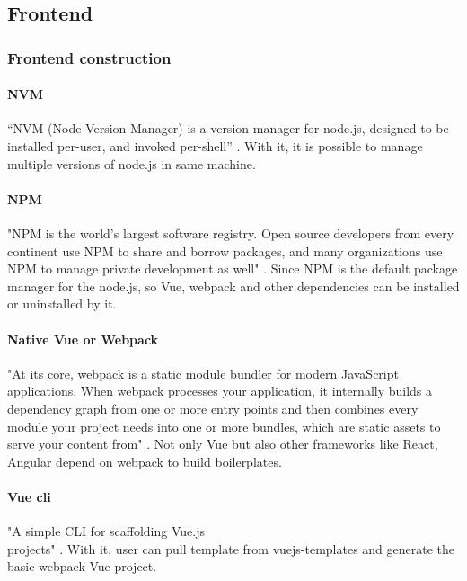 \documentclass[conference]{IEEEtran}
\begin{document}
\subsection{Frontend}

\subsubsection{Frontend construction}
 
\paragraph{NVM}
    
“NVM (Node Version Manager) is a version manager for node.js, designed to be installed per-user, and invoked per-shell” 
\cite{nvmshnvm87:online}. With it, it is possible to manage multiple versions of node.js in same machine.

\paragraph{NPM}

"NPM is the world's largest software registry. Open source developers from every continent use NPM to share and borrow packages, 
and many organizations use NPM to manage private development as well" \cite{Aboutnpm31:online}. Since NPM is the default package manager for the 
node.js, so Vue, webpack and other dependencies can be installed or uninstalled by it.

\paragraph{Native Vue or Webpack}

"At its core, webpack is a static module bundler for modern JavaScript applications. When webpack processes your application, it 
internally builds a dependency graph from one or more entry points and then combines every module your project needs into one or 
more bundles, which are static assets to serve your content from" \cite{Concepts28:online}. Not only Vue but also other frameworks like React, 
Angular depend on webpack to build boilerplates.

\paragraph{Vue cli}

"A simple CLI for scaffolding Vue.js \\projects" \cite{Introduc89:online}. With it, user can pull template from vuejs-templates and generate 
the basic webpack \+ Vue project.
\end{document}
